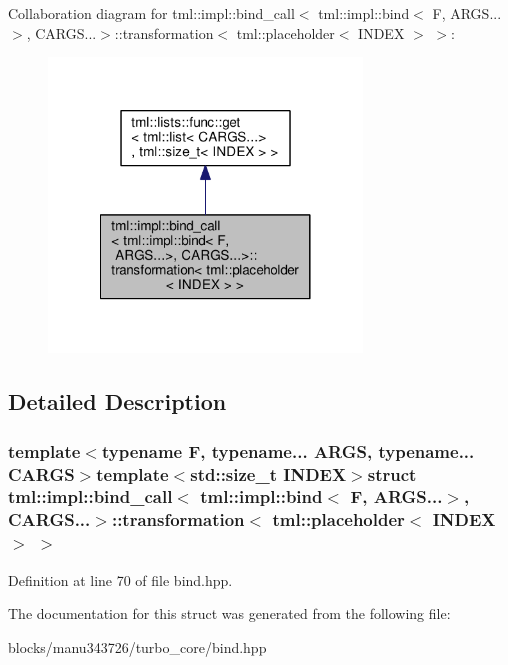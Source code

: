Collaboration diagram for tml\+:\+:impl\+:\+:bind\+\_\+call$<$ tml\+:\+:impl\+:\+:bind$<$ F, A\+R\+G\+S...$>$, C\+A\+R\+G\+S...$>$\+:\+:transformation$<$ tml\+:\+:placeholder$<$ I\+N\+D\+E\+X $>$ $>$\+:
\nopagebreak
\begin{figure}[H]
\begin{center}
\leavevmode
\includegraphics[width=236pt]{structtml_1_1impl_1_1bind__call_3_01tml_1_1impl_1_1bind_3_01_f_00_01_a_r_g_s_8_8_8_4_00_01_c_a_r9bd7b6ffa25ae8d39df61a41fc6d6d66}
\end{center}
\end{figure}


\subsection{Detailed Description}
\subsubsection*{template$<$typename F, typename... A\+R\+G\+S, typename... C\+A\+R\+G\+S$>$template$<$std\+::size\+\_\+t I\+N\+D\+E\+X$>$struct tml\+::impl\+::bind\+\_\+call$<$ tml\+::impl\+::bind$<$ F, A\+R\+G\+S...$>$, C\+A\+R\+G\+S...$>$\+::transformation$<$ tml\+::placeholder$<$ I\+N\+D\+E\+X $>$ $>$}



Definition at line 70 of file bind.\+hpp.



The documentation for this struct was generated from the following file\+:\begin{DoxyCompactItemize}
\item 
blocks/manu343726/turbo\+\_\+core/bind.\+hpp\end{DoxyCompactItemize}
